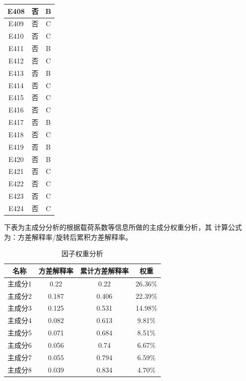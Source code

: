 \documentclass[UTF8]{ctexart}
\begin{document}
\begin{center}
\begin{longtable}{|c|c|c|}
		E408     & 否       & B        \\ \hline
		E409     & 否       & C        \\ \hline
		E410     & 否       & C        \\ \hline
		E411     & 否       & B        \\ \hline
		E412     & 否       & C        \\ \hline
		E413     & 否       & B        \\ \hline
		E414     & 否       & C        \\ \hline
		E415     & 否       & C        \\ \hline
		E416     & 否       & C        \\ \hline
		E417     & 否       & B        \\ \hline
		E418     & 否       & C        \\ \hline
		E419     & 否       & B        \\ \hline
		E420     & 否       & B        \\ \hline
		E421     & 否       & C        \\ \hline
		E422     & 否       & C        \\ \hline
		E423     & 否       & C        \\ \hline
		E424     & 否       & C        \\ \hline
	\end{longtable}
\end{center}




下表为主成分分析的根据载荷系数等信息所做的主成分权重分析，其
计算公式为：方差解释率/旋转后累积方差解释率。

\begin{table}[!ht]
	\centering
	\caption{因子权重分析}
	\begin{tabular}{|c|c|c|c|}
		\hline
		名称    & 方差解释率 & 累计方差解释率 & 权重    \\ \hline
		主成分1 & 0.22       & 0.22           & 26.36\% \\ \hline
		主成分2 & 0.187      & 0.406          & 22.39\% \\ \hline
		主成分3 & 0.125      & 0.531          & 14.98\% \\ \hline
		主成分4 & 0.082      & 0.613          & 9.81\%  \\ \hline
		主成分5 & 0.071      & 0.684          & 8.51\%  \\ \hline
		主成分6 & 0.056      & 0.74           & 6.67\%  \\ \hline
		主成分7 & 0.055      & 0.794          & 6.59\%  \\ \hline
		主成分8 & 0.039      & 0.834          & 4.70\%  \\ \hline
	\end{tabular}
\end{table}
\end{document}
